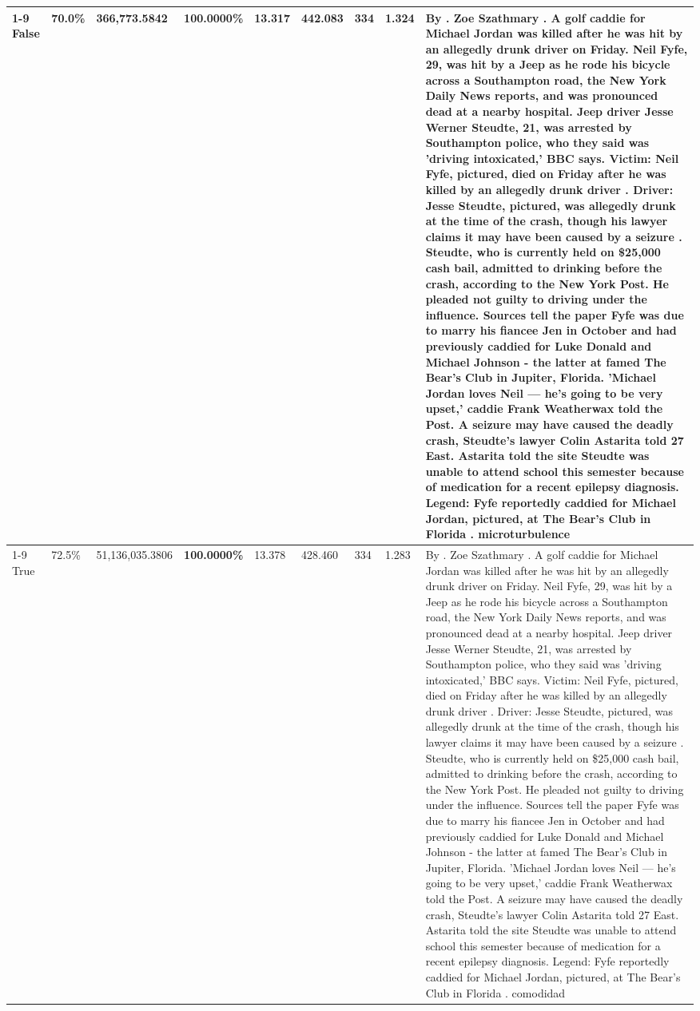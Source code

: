 \begin{table}[H]
\begin{tabular}{lllrlllll}
\cline{1-9}
False & 70.0\% & 366,773.5842 & \bfseries \color{red} 100.0000\% & 13.317 & 442.083 & 334 & 1.324 & By . Zoe Szathmary . A golf caddie for Michael Jordan was killed after he was hit by an allegedly drunk driver on Friday. Neil Fyfe, 29, was hit by a Jeep as he rode his bicycle across a Southampton road, the New York Daily News reports, and was pronounced dead at a nearby hospital. Jeep driver Jesse Werner Steudte, 21, was arrested by Southampton police, who they said was 'driving intoxicated,' BBC says. Victim: Neil Fyfe, pictured, died on Friday after he was killed by an allegedly drunk driver . Driver: Jesse Steudte, pictured, was allegedly drunk at the time of the crash, though his lawyer claims it may have been caused by a seizure . Steudte, who is currently held on \$25,000 cash bail, admitted to drinking before the crash, according to the New York Post. He pleaded not guilty to driving under the influence. Sources tell the paper Fyfe was due to marry his fiancee Jen in October and had previously caddied for Luke Donald and Michael Johnson - the latter at famed The Bear's Club in Jupiter, Florida. 'Michael Jordan loves Neil — he’s going to be very upset,' caddie Frank Weatherwax told the Post. A seizure may have caused the deadly crash, Steudte's lawyer Colin Astarita told 27 East. Astarita told the site Steudte was unable to attend school this semester because of medication for a recent epilepsy diagnosis. Legend: Fyfe reportedly caddied for Michael Jordan, pictured, at The Bear's Club in Florida . microturbulence \\
\cline{1-9}
True & 72.5\% & 51,136,035.3806 & \bfseries \color{red} 100.0000\% & 13.378 & 428.460 & 334 & 1.283 & By . Zoe Szathmary . A golf caddie for Michael Jordan was killed after he was hit by an allegedly drunk driver on Friday. Neil Fyfe, 29, was hit by a Jeep as he rode his bicycle across a Southampton road, the New York Daily News reports, and was pronounced dead at a nearby hospital. Jeep driver Jesse Werner Steudte, 21, was arrested by Southampton police, who they said was 'driving intoxicated,' BBC says. Victim: Neil Fyfe, pictured, died on Friday after he was killed by an allegedly drunk driver . Driver: Jesse Steudte, pictured, was allegedly drunk at the time of the crash, though his lawyer claims it may have been caused by a seizure . Steudte, who is currently held on \$25,000 cash bail, admitted to drinking before the crash, according to the New York Post. He pleaded not guilty to driving under the influence. Sources tell the paper Fyfe was due to marry his fiancee Jen in October and had previously caddied for Luke Donald and Michael Johnson - the latter at famed The Bear's Club in Jupiter, Florida. 'Michael Jordan loves Neil — he’s going to be very upset,' caddie Frank Weatherwax told the Post. A seizure may have caused the deadly crash, Steudte's lawyer Colin Astarita told 27 East. Astarita told the site Steudte was unable to attend school this semester because of medication for a recent epilepsy diagnosis. Legend: Fyfe reportedly caddied for Michael Jordan, pictured, at The Bear's Club in Florida . comodidad \\

\end{tabular}
\end{table}
